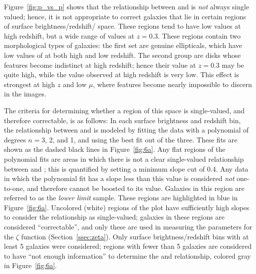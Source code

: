 \documentclass[twocolumn]{aastex6}
\begin{document}
Figure~\ref{fig:p_vs_p} shows that the relationship between \pfeaturesz{} and \pfeaturesrest{} is \emph{not} always single valued; hence, it is not appropriate to correct galaxies that lie in certain regions of surface brightness/redshift/\pfeatures{} space. These regions tend to have low \pfeatures{} values at high redshift, but a wide range of values at $z=0.3$. These regions contain two morphological types of galaxies: the first set are genuine ellipticals, which have low values of \pfeatures{} at both high and low redshift. The second group are disks whose features become indistinct at high redshift; hence their \pfeatures{} value at $z=0.3$ may be quite high, while the value observed at high redshift is very low. This effect is strongest at high $z$ and low $\mu$, where features become nearly impossible to discern in the images.

The criteria for determining whether a region of this space is single-valued, and therefore correctable, is as follows: In each surface brightness and redshift bin, the relationship between \pfeaturesz{} and \pfeaturesrest{} is modeled by fitting the data with a polynomial of degrees $n=3$, 2, and 1, and using the best fit out of the three. These fits are shown as the dashed black lines in Figure~\ref{fig:6a}. Any flat regions of the polynomial fits are areas in which there is not a clear single-valued relationship between \pfeaturesz{} and \pfeaturesrest; this is quantified by setting a minimum slope cut of 0.4. Any data in which the polynomial fit has a slope less than this value is considered \emph{not} one-to-one, and therefore \pfeaturesz{} cannot be boosted to its \pfeaturesrest{} value. Galaxies in this region are referred to as the \emph{lower limit} sample. These regions are highlighted in blue in Figure~\ref{fig:6a}. Uncolored (white) regions of the plot have sufficiently high slopes to consider the relationship as single-valued; galaxies in these regions are considered ``correctable'', and only these are used in measuring the parameters for the $\zeta$ function (Section~\ref{ssec:zeta}). Only surface brightness/redshift bins with at least 5 galaxies were considered; regions with fewer than 5 galaxies are considered to have ``not enough information'' to determine the \pfeaturesz{} and \pfeaturesrest{} relationship, colored gray in Figure~\ref{fig:6a}.
\end{document}
